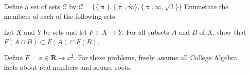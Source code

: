 \documentclass[12pt,fleqn,answers]{exam}
\newcommand{\reals}{\mathbf{R}}
\newcommand{\curly}[1]{\mathcal #1}
\begin{document}
\begin{questions}


\question Define a set of sets $\curly{C}$ by $\curly{C} = \{\{\uppi\}, \{\uppi, \infty\},
 \{\uppi, \infty, \sqrt{3} \} \}$ Enumerate the members of each of the following sets:


\question [10] Let $X$ and $Y$ be sets and let $F \in X \to Y$. For all subsets $A$ and $B$
of $X$, show that $F(A \cap B) \subset F(A) \cap F(B)$.
\begin{solution}

\end{solution}

\question Define $F = x \in \reals \mapsto x^2$.  For these problems, freely assume all College Algebra facts
about real numbers and square roots.
\end{questions}
\end{document}
